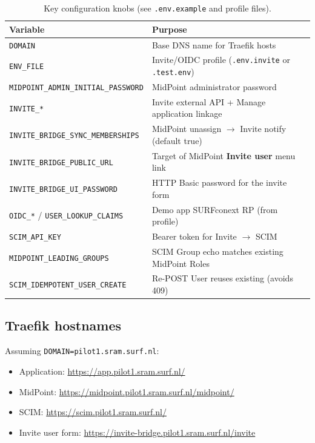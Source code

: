 \documentclass[11pt,a4paper]{article}
\begin{document}
\begin{table}[H]
\centering
\begin{tabularx}{\textwidth}{@{}l X@{}}
\toprule
\textbf{Variable} & \textbf{Purpose} \\
\midrule
\texttt{DOMAIN} & Base DNS name for Traefik hosts \\
\texttt{ENV\_FILE} & Invite/OIDC profile (\texttt{.env.invite} or \texttt{.test.env}) \\
\texttt{MIDPOINT\_ADMIN\_INITIAL\_PASSWORD} & MidPoint administrator password \\
\texttt{INVITE\_*} & Invite external API + Manage application linkage \\
\texttt{INVITE\_BRIDGE\_SYNC\_MEMBERSHIPS} & MidPoint unassign $\rightarrow$ Invite notify (default true) \\
\texttt{INVITE\_BRIDGE\_PUBLIC\_URL} & Target of MidPoint \textbf{Invite user} menu link \\
\texttt{INVITE\_BRIDGE\_UI\_PASSWORD} & HTTP Basic password for the invite form \\
\texttt{OIDC\_*} / \texttt{USER\_LOOKUP\_CLAIMS} & Demo app SURFconext RP (from profile) \\
\texttt{SCIM\_API\_KEY} & Bearer token for Invite $\rightarrow$ SCIM \\
\texttt{MIDPOINT\_LEADING\_GROUPS} & SCIM Group echo matches existing MidPoint Roles \\
\texttt{SCIM\_IDEMPOTENT\_USER\_CREATE} & Re-POST User reuses existing (avoids 409) \\
\bottomrule
\end{tabularx}
\caption{Key configuration knobs (see \texttt{.env.example} and profile files).}
\end{table}

\subsection{Traefik hostnames}

Assuming \texttt{DOMAIN=pilot1.sram.surf.nl}:

\begin{itemize}[leftmargin=*]
  \item Application: \url{https://app.pilot1.sram.surf.nl/}
  \item MidPoint: \url{https://midpoint.pilot1.sram.surf.nl/midpoint/}
  \item SCIM: \url{https://scim.pilot1.sram.surf.nl/}
  \item Invite user form: \url{https://invite-bridge.pilot1.sram.surf.nl/invite}
\end{itemize}
\end{document}
